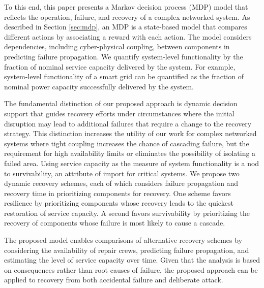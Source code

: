 \documentclass[runningheads]{llncs}
\begin{document}
To this end, this paper presents a Markov decision process (MDP) model that reflects the operation, failure, and recovery of a complex networked system. As described in Section \ref{sec:mdp}, an MDP is a state-based model that compares different actions by associating a reward with each action. The model considers dependencies, including cyber-physical coupling, between components in predicting failure propagation. We quantify system-level functionality by the fraction of nominal service capacity delivered by the system. For example, system-level functionality of a smart grid can be quantified as the fraction of  nominal power capacity successfully delivered by the system.

The fundamental distinction of our proposed approach is dynamic decision support that guides recovery efforts under circumstances where the initial disruption may lead to additional failures that require a change to the recovery strategy. This distinction increases the utility of our work for complex networked systems where tight coupling increases the chance of cascading failure, but the requirement for high availability limits or eliminates the possibility of isolating a failed area. Using service capacity as the measure of system functionality is a nod to survivability, an attribute of import for critical systems. We propose two dynamic recovery schemes, each of which considers failure propagation and recovery time in prioritizing components for recovery. One scheme favors resilience by prioritizing components whose recovery leads to the quickest restoration of service capacity. A second favors survivability by prioritizing the recovery of components whose failure is most likely to cause a cascade. 





The proposed model enables comparisons of alternative recovery schemes by considering the availability of repair crews, predicting failure propagation, and estimating the level of service capacity over time. Given that the analysis is based on consequences rather than root causes of failure, the proposed approach can be applied to recovery from both accidental failure and deliberate attack.
\end{document}
